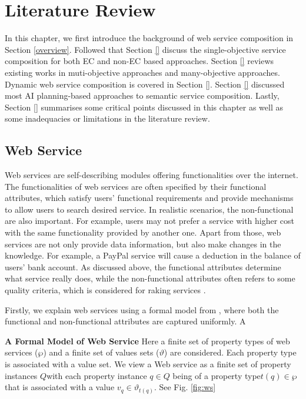\chapter{Literature Review}\label{C:review}

In this chapter, we first introduce the background of web service composition in Section \ref{overview}.  Followed that Section \ref{} discuss the single-objective service composition for both EC and non-EC based approaches. Section  \ref{} reviews existing works in muti-objective approaches and many-objective approaches.  Dynamic web service composition is covered in Section \ref{}. Section \ref{}  discussed most AI planning-based approaches to semantic service composition. Lastly, Section \ref{} summarises some critical points discussed in this chapter as well as some inadequacies or limitations in the literature review.

\section{Web Service}\label{service}
Web services are self-describing modules offering functionalities over the internet. The functionalities of web services are often specified by their functional attributes, which satisfy users' functional requirements and provide mechanisms to allow users to search desired service. In realistic scenarios, the non-functional are also important. For example, users may not prefer a service with higher cost with the same functionality provided by another one. Apart from those, web services are not only provide data information, but also make changes in the knowledge. For example, a PayPal service will cause a deduction in the balance of users' bank account. As discussed above, the functional attributes determine what service really does, while the non-functional attributes often refers to some quality criteria, which is considered for raking services \cite{agarwal2009making}. 

Firstly, we explain web services using a formal model from \cite{agarwal2010d5}, where both the functional and non-functional attributes are captured uniformly. A

\textbf{A Formal Model of Web Service} Here a finite set of property types of web services ($\wp$) and a finite set of values sets ($\vartheta$) are considered. Each property type is associated with a value set. We view a Web service as a finite set of property instances $Q$with each property instance $q \in Q$ being of a property type$t(q) \in \wp$ that is associated with a value $v_q \in \vartheta_{t(q)}$. See Fig. \ref{fig:ws}

